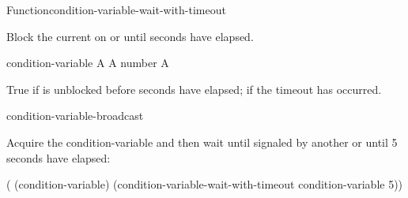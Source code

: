\documentclass[10pt,twoside,english,pdftex]{article}
\begin{document}
\begin{functiondoc}{Function}{condition-variable-wait-with-timeout}%
  {
    }

%

\fnsyntax

\fnpurpose Block the current  on
 or until  seconds have
elapsed.

\fnpackage {}

\fnmodule {}

\fnargs
\begin{args}{condition-variable}
 A 
\arg[seconds] A number
\arg[boolean] A 
\end{args}

\fnreturns True if  is unblocked before
 seconds have elapsed; \nil{} if the timeout has occurred.

\fnerrors
\nocvlock{}
\par
\nothreads{}

\begin{alsos}{condition-variable-broadcast}
\end{alsos}

%
\fnexample Acquire the condition-variable  and then wait until
signaled by another  or until 5 seconds have elapsed:
%
\W\supp
\begin{example}
  ( (condition-variable)
    (condition-variable-wait-with-timeout condition-variable 5))
\end{example}

\end{functiondoc}

\end{document}
